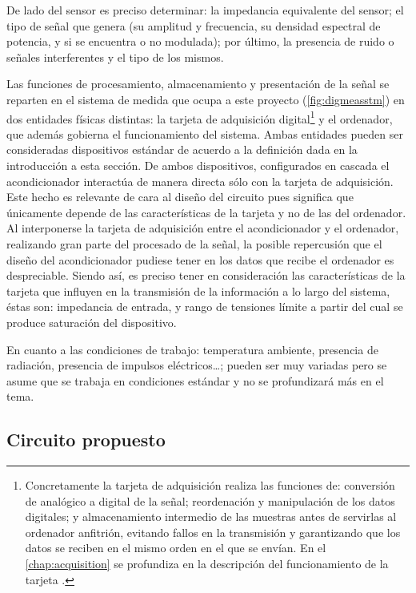 De lado del sensor es preciso determinar: la impedancia equivalente del
sensor; el tipo de señal que genera (su amplitud y frecuencia, su densidad
espectral de potencia, y si se encuentra o no modulada); por último, la
presencia de ruido o señales interferentes y el tipo de los mismos.

Las funciones de procesamiento, almacenamiento y presentación de la señal
se reparten en el sistema de medida que ocupa a este proyecto
(\vref{fig:digmeasstm}) en dos entidades físicas distintas: la tarjeta de
adquisición digital\footnote{Concretamente la tarjeta de adquisición
realiza las funciones de: conversión de analógico a digital de la señal;
reordenación y manipulación de los datos digitales; y almacenamiento
intermedio de las muestras antes de servirlas al ordenador anfitrión,
evitando fallos en la transmisión y garantizando que los datos se reciben
en el mismo orden en el que se envían. En el \cref{chap:acquisition} se
profundiza en la descripción del funcionamiento de la tarjeta \kpci{}.} y
el ordenador, que además gobierna el funcionamiento del sistema. Ambas
entidades pueden ser consideradas dispositivos estándar de acuerdo a la
definición dada en la introducción a esta sección. De ambos dispositivos,
configurados en cascada el acondicionador interactúa de manera directa
sólo con la tarjeta de adquisición. Este hecho es relevante de cara al
diseño del circuito pues significa que únicamente depende de las
características de la tarjeta y no de las del ordenador. Al interponerse la
tarjeta de adquisición entre el acondicionador y el ordenador, realizando
gran parte del procesado de la señal, la posible repercusión que el diseño
del acondicionador pudiese tener en los datos que recibe el ordenador es
despreciable. Siendo así, es preciso tener en consideración las
características de la tarjeta que influyen en la transmisión de la
información a lo largo del sistema, éstas son: impedancia de entrada, y
rango de tensiones límite a partir del cual se produce saturación del
dispositivo.

En cuanto a las condiciones de trabajo: temperatura ambiente, presencia de
radiación, presencia de impulsos eléctricos\dots; pueden ser muy variadas
pero se asume que se trabaja en condiciones estándar y no se profundizará
más en el tema.


\subsection{Circuito propuesto}

